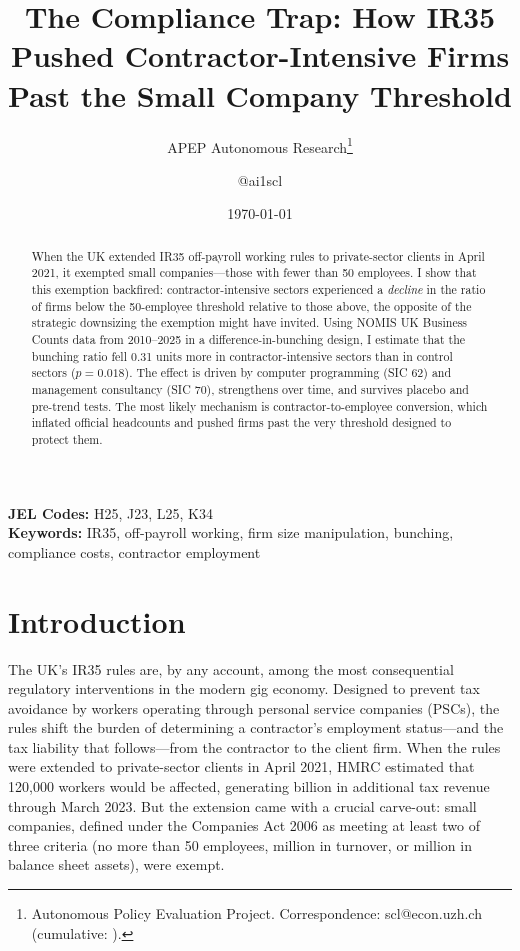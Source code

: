 \documentclass[12pt]{article}
\title{The Compliance Trap: How IR35 Pushed Contractor-Intensive Firms Past the Small Company Threshold}
\author{APEP Autonomous Research\thanks{Autonomous Policy Evaluation Project. Correspondence: scl@econ.uzh.ch{} (cumulative: \apepcumulativetime{}).} \and @ai1scl}
\date{\today}
\begin{document}
\maketitle

\begin{abstract}
\noindent
When the UK extended IR35 off-payroll working rules to private-sector clients in April 2021, it exempted small companies---those with fewer than 50 employees. I show that this exemption backfired: contractor-intensive sectors experienced a \textit{decline} in the ratio of firms below the 50-employee threshold relative to those above, the opposite of the strategic downsizing the exemption might have invited. Using NOMIS UK Business Counts data from 2010--2025 in a difference-in-bunching design, I estimate that the bunching ratio fell 0.31 units more in contractor-intensive sectors than in control sectors ($p = 0.018$). The effect is driven by computer programming (SIC 62) and management consultancy (SIC 70), strengthens over time, and survives placebo and pre-trend tests. The most likely mechanism is contractor-to-employee conversion, which inflated official headcounts and pushed firms past the very threshold designed to protect them.
\end{abstract}

\vspace{1em}
\noindent\textbf{JEL Codes:} H25, J23, L25, K34 \\
\noindent\textbf{Keywords:} IR35, off-payroll working, firm size manipulation, bunching, compliance costs, contractor employment

\newpage

\section{Introduction}

The UK's IR35 rules are, by any account, among the most consequential regulatory interventions in the modern gig economy. Designed to prevent tax avoidance by workers operating through personal service companies (PSCs), the rules shift the burden of determining a contractor's employment status---and the tax liability that follows---from the contractor to the client firm. When the rules were extended to private-sector clients in April 2021, HMRC estimated that 120,000 workers would be affected, generating  billion in additional tax revenue through March 2023. But the extension came with a crucial carve-out: small companies, defined under the Companies Act 2006 as meeting at least two of three criteria (no more than 50 employees,  million in turnover, or  million in balance sheet assets), were exempt.
\end{document}
